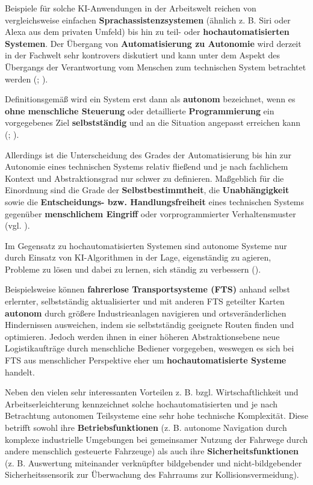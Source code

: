 \documentclass [oneside,10pt,a4paper,ngerman,BCOR10mm,headsepline,parindent,final]{scrartcl}
\begin{document}
Beispiele für solche KI-Anwendungen in der Arbeitswelt reichen von
vergleichsweise einfachen \textbf{Sprachassistenzsystemen} (ähnlich z.
B. Siri oder Alexa aus dem privaten Umfeld) bis hin zu teil- oder
\textbf{hochautomatisierten Systemen}. Der Übergang von
\textbf{Automatisierung zu Autonomie} wird derzeit in der Fachwelt sehr
kontrovers diskutiert und kann unter dem Aspekt des Übergangs der
Verantwortung vom Menschen zum technischen System betrachtet werden
(\cite{Adler_2021}; \cite{Adler_2019}).

Definitionsgemäß wird ein System erst dann als \textbf{autonom}
bezeichnet, wenn es \textbf{ohne menschliche Steuerung} oder
detaillierte \textbf{Programmierung} ein vorgegebenes Ziel
\textbf{selbstständig} und an die Situation angepasst erreichen kann
(\cite{EFI_autSysteme_2018}; \cite{acatech_2017}).

Allerdings ist die Unterscheidung des Grades der Automatisierung bis hin
zur Autonomie eines technischen Systems relativ fließend und je nach
fachlichem Kontext und Abstraktionsgrad nur schwer zu definieren.
Maßgeblich für die Einordnung sind die Grade der
\textbf{Selbstbestimmtheit}, die \textbf{Unabhängigkeit} sowie die
\textbf{Entscheidungs- bzw. Handlungsfreiheit} eines technischen Systems
gegenüber \textbf{menschlichem Eingriff} oder vorprogrammierter
Verhaltensmuster (vgl. \cite{Wiki_Autonomie}).

Im Gegensatz zu hochautomatisierten Systemen sind autonome Systeme nur
durch Einsatz von KI-Algorithmen in der Lage, eigenständig zu agieren,
Probleme zu lösen und dabei zu lernen, sich ständig zu verbessern
(\cite{acatech_2017}).

Beispielsweise können \textbf{fahrerlose Transportsysteme (FTS)} anhand
selbst erlernter, selbstständig aktualisierter und mit anderen FTS
geteilter Karten \textbf{autonom} durch größere Industrieanlagen
navigieren und ortsveränderlichen Hindernissen ausweichen, indem sie
selbstständig geeignete Routen finden und optimieren. Jedoch werden
ihnen in einer höheren Abstraktionsebene neue Logistikaufträge durch
menschliche Bediener vorgegeben, weswegen es sich bei FTS aus
menschlicher Perspektive eher um \textbf{hochautomatisierte Systeme}
handelt.

Neben den vielen sehr interessanten Vorteilen z. B. bzgl.
Wirtschaftlichkeit und Arbeitserleichterung kennzeichnet solche
hochautomatisierten und je nach Betrachtung autonomen Teilsysteme eine
sehr hohe technische Komplexität. Diese betrifft sowohl ihre
\textbf{Betriebsfunktionen} (z. B. autonome Navigation durch komplexe
industrielle Umgebungen bei gemeinsamer Nutzung der Fahrwege durch
andere menschlich gesteuerte Fahrzeuge) als auch ihre
\textbf{Sicherheitsfunktionen} (z. B. Auswertung miteinander verknüpfter
bildgebender und nicht-bildgebender Sicherheitssensorik zur Überwachung
des Fahrraums zur Kollisionsvermeidung).
\end{document}

